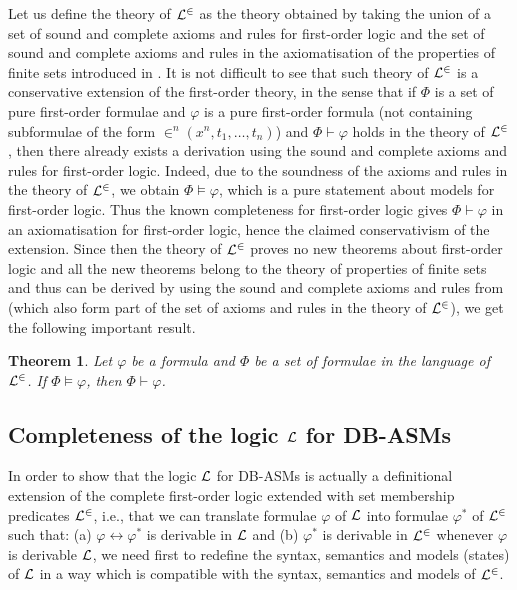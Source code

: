 \documentclass[preprint,11pt]{elsarticle}
\newtheorem{theorem}{Theorem}[section]
\theoremstyle{definition}
\theoremstyle{remark}
\begin{document}
Let us define the theory of ${\cal L}^\in$ as the theory obtained by taking the union of a set of sound and complete axioms and rules for first-order logic and the set of sound and complete axioms and rules in the axiomatisation of the properties of finite sets introduced in \cite{agotness:ljigpl2008}. It is not difficult to see that such theory of ${\cal L}^\in$ is a conservative extension of the first-order theory, in the sense that if $\Phi$ is a set of pure first-order formulae and $\varphi$ is a pure first-order formula (not containing subformulae of the form $\in^n\!\!(x^n, t_1, \ldots, t_n)$) and $\Phi \vdash \varphi$ holds in the theory of ${\cal L}^\in$, then there already exists a derivation using the sound and complete axioms and rules for first-order logic. Indeed, due to the soundness of the axioms and rules in the theory of ${\cal L}^\in$, we obtain $\Phi \models \varphi$, which is a pure statement about models for first-order logic. Thus the known completeness for first-order logic gives $\Phi \vdash \varphi$ in an axiomatisation for first-order logic, hence the claimed conservativism of the extension. Since then the theory of ${\cal L}^\in$ proves no new theorems about first-order logic and all the new theorems belong to the theory of properties of finite sets and thus can be derived by using the sound and complete axioms and rules from \cite{agotness:ljigpl2008} (which also form part of the set of axioms and rules in the theory of ${\cal L}^\in$), we get the following important result.

\begin{theorem}\label{CompletenessLin}
Let $\varphi$ be a formula and $\Phi$ be a set of formulae in the language of ${\cal L}^\in$. If $\Phi\models\varphi$, then $\Phi\vdash\varphi$.
\end{theorem}

\subsection{Completeness of the logic $\cal L$ for DB-ASMs}

In order to show that the logic ${\cal L}$ for DB-ASMs is actually a definitional extension of the complete first-order logic extended with set membership predicates ${\cal L}^\in$,
i.e., that we can translate formulae $\varphi$ of $\cal L$ into formulae $\varphi^*$ of ${\cal L}^\in$ such that: (a) $\varphi\leftrightarrow \varphi^*$ is derivable in ${\cal L}$ and (b)  $\varphi^*$ is derivable in ${\cal L}^\in$ whenever $\varphi$ is derivable ${\cal L}$, we need first to redefine the syntax, semantics and models (states) of ${\cal L}$ in a way which is compatible with the syntax, semantics and models of ${\cal L}^\in$.
\end{document}
